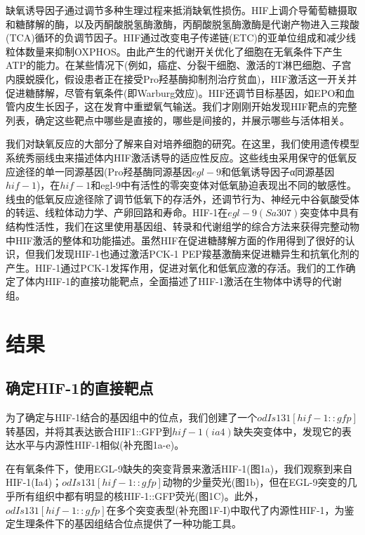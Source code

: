 \documentclass{ctexart}
\begin{document}
    缺氧诱导因子通过调节多种生理过程来抵消缺氧性损伤。HIF上调介导葡萄糖摄取和糖酵解的酶，以及丙酮酸脱氢酶激酶，丙酮酸脱氢酶激酶是代谢产物进入三羧酸(TCA)循环的负调节因子。HIF通过改变电子传递链(ETC)的亚单位组成和减少线粒体数量来抑制OXPHOS。由此产生的代谢开关优化了细胞在无氧条件下产生ATP的能力。在某些情况下(例如，癌症、分裂干细胞、激活的T淋巴细胞、子宫内膜蜕膜化，假设患者正在接受Pro羟基酶抑制剂治疗贫血)，HIF激活这一开关并促进糖酵解，尽管有氧条件(即Warburg效应)。HIF还调节目标基因，如EPO和血管内皮生长因子，这在发育中重塑氧气输送。我们才刚刚开始发现HIF靶点的完整列表，确定这些靶点中哪些是直接的，哪些是间接的，并展示哪些与活体相关。

    我们对缺氧反应的大部分了解来自对培养细胞的研究。在这里，我们使用遗传模型系统秀丽线虫来描述体内HIF激活诱导的适应性反应。这些线虫采用保守的低氧反应途径的单一同源基因(Pro羟基酶同源基因$egl-9$和低氧诱导因子α同源基因$hif-1$)，在$hif-1$和egl-9中有活性的零突变体对低氧胁迫表现出不同的敏感性。线虫的低氧反应途径除了调节低氧下的存活外，还调节行为、神经元中谷氨酸受体的转运、线粒体动力学、产卵回路和寿命。HIF-1在$egl-9(Sa307)$突变体中具有结构性活性，我们在这里使用基因组、转录和代谢组学的综合方法来获得完整动物中HIF激活的整体和功能描述。虽然HIF在促进糖酵解方面的作用得到了很好的认识，但我们发现HIF-1也通过激活PCK-1 PEP羧基激酶来促进糖异生和抗氧化剂的产生。HIF-1通过PCK-1发挥作用，促进对氧化和低氧应激的存活。我们的工作确定了体内HIF-1的直接功能靶点，全面描述了HIF-1激活在生物体中诱导的代谢组。


    

    \section{结果}
    \subsection{确定HIF-1的直接靶点}

    为了确定与HIF-1结合的基因组中的位点，我们创建了一个$odIs131[hif-1::gfp]$转基因，并将其表达嵌合HIF1::GFP到$hif-1(ia4)$缺失突变体中，发现它的表达水平与内源性HIF-1相似(补充图1a-e)。

    在有氧条件下，使用EGL-9缺失的突变背景来激活HIF-1(图1a)，我们观察到来自HIF-1(Ia4)；$odIs131[hif-1::gfp]$动物的少量荧光(图1b)，但在EGL-9突变的几乎所有组织中都有明显的核HIF-1::GFP荧光(图1C)。此外，$odIs131[hif-1::gfp]$在多个突变表型(补充图1F-I)中取代了内源性HIF-1，为鉴定生理条件下的基因组结合位点提供了一种功能工具。
    
\end{document}
